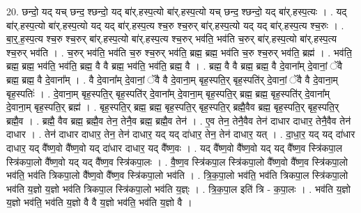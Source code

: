 \documentclass[17pt]{extarticle}
\begin{document}
20. छन्दो॒ यद् यच् छन्द॒ श्छन्दो॒ यद् बा॑र्.हस्प॒त्यो बा॑र्.हस्प॒त्यो यच् छन्द॒ श्छन्दो॒ यद् बा॑र्.हस्प॒त्यः । . यद् बा॑र्.हस्प॒त्यो बा॑र्.हस्प॒त्यो यद् यद् बा॑र्.हस्प॒त्य श्च॒रु श्च॒रुर् बा॑र्.हस्प॒त्यो यद् यद् बा॑र्.हस्प॒त्य श्च॒रुः । . बा॒र्॒.ह॒स्प॒त्य श्च॒रु श्च॒रुर् बा॑र्.हस्प॒त्यो बा॑र्.हस्प॒त्य श्च॒रुर् भव॑ति॒ भव॑ति च॒रुर् बा॑र्.हस्प॒त्यो बा॑र्.हस्प॒त्य श्च॒रुर् भव॑ति । . च॒रुर् भव॑ति॒ भव॑ति च॒रु श्च॒रुर् भव॑ति॒ ब्रह्म॒ ब्रह्म॒ भव॑ति च॒रु श्च॒रुर् भव॑ति॒ ब्रह्म॑ । . भव॑ति॒ ब्रह्म॒ ब्रह्म॒ भव॑ति॒ भव॑ति॒ ब्रह्म॒ वै वै ब्रह्म॒ भव॑ति॒ भव॑ति॒ ब्रह्म॒ वै । . ब्रह्म॒ वै वै ब्रह्म॒ ब्रह्म॒ वै दे॒वाना᳚म् दे॒वानां॒ ॅवै ब्रह्म॒ ब्रह्म॒ वै दे॒वाना᳚म् । . वै दे॒वाना᳚म् दे॒वानां॒ ॅवै वै दे॒वाना॒म् बृह॒स्पति॒र् बृह॒स्पति॑र् दे॒वानां॒ ॅवै वै दे॒वाना॒म् बृह॒स्पतिः॑ । . दे॒वाना॒म् बृह॒स्पति॒र् बृह॒स्पति॑र् दे॒वाना᳚म् दे॒वाना॒म् बृह॒स्पति॒र् ब्रह्म॒ ब्रह्म॒ बृह॒स्पति॑र् दे॒वाना᳚म् दे॒वाना॒म् बृह॒स्पति॒र् ब्रह्म॑ । . बृह॒स्पति॒र् ब्रह्म॒ ब्रह्म॒ बृह॒स्पति॒र् बृह॒स्पति॒र् ब्रह्मै॒वैव ब्रह्म॒ बृह॒स्पति॒र् बृह॒स्पति॒र् ब्रह्मै॒व । . ब्रह्मै॒ वैव ब्रह्म॒ ब्रह्मै॒व तेन॒ तेनै॒व ब्रह्म॒ ब्रह्मै॒व तेन॑ । . ए॒व तेन॒ तेनै॒वैव तेन॑ दाधार दाधार॒ तेनै॒वैव तेन॑ दाधार । . तेन॑ दाधार दाधार॒ तेन॒ तेन॑ दाधार॒ यद् यद् दा॑धार॒ तेन॒ तेन॑ दाधार॒ यत् । . दा॒धा॒र॒ यद् यद् दा॑धार दाधार॒ यद् वै᳚ष्ण॒वो वै᳚ष्ण॒वो यद् दा॑धार दाधार॒ यद् वै᳚ष्ण॒वः । . यद् वै᳚ष्ण॒वो वै᳚ष्ण॒वो यद् यद् वै᳚ष्ण॒व स्त्रि॑कपा॒ल स्त्रि॑कपा॒लो वै᳚ष्ण॒वो यद् यद् वै᳚ष्ण॒व स्त्रि॑कपा॒लः । . वै॒ष्ण॒व स्त्रि॑कपा॒ल स्त्रि॑कपा॒लो वै᳚ष्ण॒वो वै᳚ष्ण॒व स्त्रि॑कपा॒लो भव॑ति॒ भव॑ति त्रिकपा॒लो वै᳚ष्ण॒वो वै᳚ष्ण॒व स्त्रि॑कपा॒लो भव॑ति । . त्रि॒क॒पा॒लो भव॑ति॒ भव॑ति त्रिकपा॒ल स्त्रि॑कपा॒लो भव॑ति य॒ज्ञो य॒ज्ञो भव॑ति त्रिकपा॒ल स्त्रि॑कपा॒लो भव॑ति य॒ज्ञ्ः । . त्रि॒क॒पा॒ल इति॑ त्रि - क॒पा॒लः । . भव॑ति य॒ज्ञो य॒ज्ञो भव॑ति॒ भव॑ति य॒ज्ञो वै वै य॒ज्ञो भव॑ति॒ भव॑ति य॒ज्ञो वै । \newline
\end{document}
